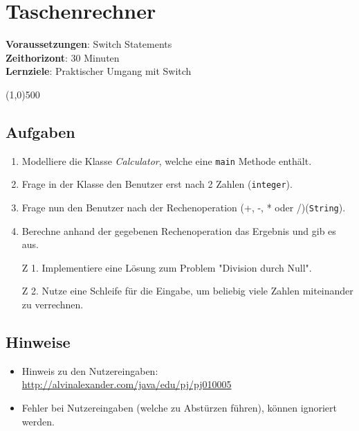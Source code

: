

\chapter*{Taschenrechner}

\headingfont
\parbox {\textwidth}{
    \textbf{Voraussetzungen}: Switch Statements \\
    \textbf{Zeithorizont}: 30 Minuten \\
    \textbf{Lernziele}: Praktischer Umgang mit Switch
}

\normalfont
\begin{center}
\line(1,0){500}
\end{center}
\vspace{1cm}

\section*{Aufgaben}
\begin{enumerate}
     \item Modelliere die Klasse \textit{Calculator}, welche eine \texttt{main} Methode enthält.
     \item Frage in der Klasse den Benutzer erst nach 2 Zahlen (\texttt{integer}).
     \item Frage nun den Benutzer nach der Rechenoperation (+, -, * oder /)(\texttt{String}).
     \item Berechne anhand der gegebenen Rechenoperation das Ergebnis und gib es aus.
     \item [Z 1.] Implementiere eine Lösung zum Problem "Division durch Null".
     \item [Z 2.] Nutze eine Schleife für die Eingabe, um beliebig viele Zahlen miteinander zu verrechnen.
\end{enumerate}

\section*{Hinweise}
\begin{itemize}
    \item Hinweis zu den Nutzereingaben: \url{http://alvinalexander.com/java/edu/pj/pj010005}
    \item Fehler bei Nutzereingaben (welche zu Abstürzen führen), können ignoriert werden.
\end{itemize}
